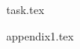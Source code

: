 \documentclass{metrotek}
\begin{document}

\maketitle

\newpage

\setcounter{page}{2}
\tableofcontents

\newpage

{task.tex}

\newpage

{appendix1.tex}
\end{document}
